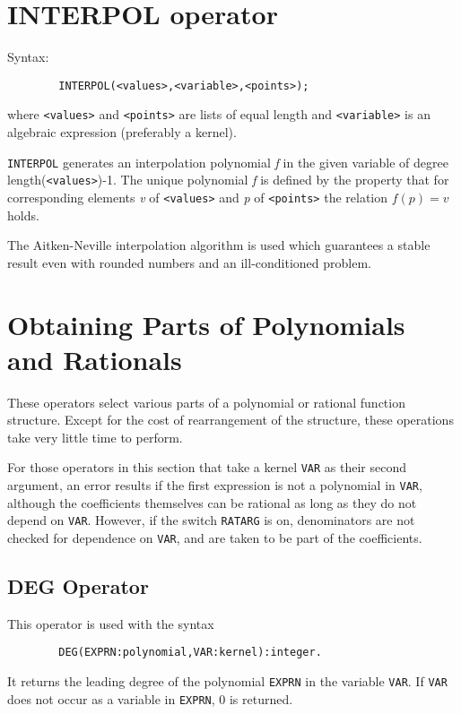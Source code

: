 \section{INTERPOL operator}

Syntax:
\begin{verbatim}
        INTERPOL(<values>,<variable>,<points>);
\end{verbatim}

where {\tt <values>} and {\tt <points>} are lists of equal length and
{\tt <variable>} is an algebraic expression (preferably a kernel).

{\tt INTERPOL} generates an interpolation polynomial {\em f\/} in the given
variable of degree length({\tt <values>})-1.  The unique polynomial {\em f\/}
is defined by the property that for corresponding elements {\em v\/} of
{\tt <values>} and {\em p\/} of {\tt <points>} the relation $f(p)=v$ holds.

The Aitken-Neville interpolation algorithm is used which guarantees a
stable result even with rounded numbers and an ill-conditioned problem.

\section{Obtaining Parts of Polynomials and Rationals}

These operators select various parts of a polynomial or rational function
structure. Except for the cost of rearrangement of the structure, these
operations take very little time to perform.

For those operators in this section that take a kernel {\tt VAR} as their
second argument, an error results if the first expression is not a
polynomial in {\tt VAR}, although the coefficients themselves can be
rational as long as they do not depend on {\tt VAR}.  However, if the
switch {\tt RATARG} is on, denominators are not checked
for dependence on {\tt VAR}, and are taken to be part of the coefficients.

\subsection{DEG Operator}

This operator is used with the syntax
\begin{verbatim}
        DEG(EXPRN:polynomial,VAR:kernel):integer.
\end{verbatim}
It returns the leading degree of the polynomial {\tt EXPRN}
in the variable {\tt VAR}.  If {\tt VAR} does not occur as a variable in
{\tt EXPRN}, 0 is returned.

